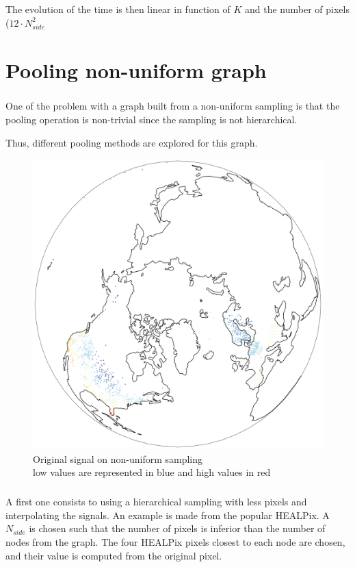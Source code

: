 \documentclass[11pt]{report}
\begin{document}
\paragraph*{}
The evolution of the time is then linear in function of $K$ and the number of pixels ($12\cdot N_{side}^2$

\chapter{Pooling non-uniform graph}\label{sec:irreg_pool}
\paragraph*{}
One of the problem with a graph built from a non-uniform sampling is that the pooling operation is non-trivial since the sampling is not hierarchical.

Thus, different pooling methods are explored for this graph.

\begin{figure}[!ht]
    \centering
    \includegraphics[width=0.6\linewidth]{figures/original_signal.png}
    \caption{Original signal on non-uniform sampling\\low values are represented in blue and high values in red}
    \label{fig:origin_sig}
\end{figure}
\clearpage
\paragraph*{}
A first one consists to using a hierarchical sampling with less pixels and interpolating the signals. An example is made from the popular HEALPix. A $N_{side}$ is chosen such that the number of pixels is inferior than the number of nodes from the graph. The four HEALPix pixels closest to each node are chosen, and their value is computed from the original pixel.
\end{document}
